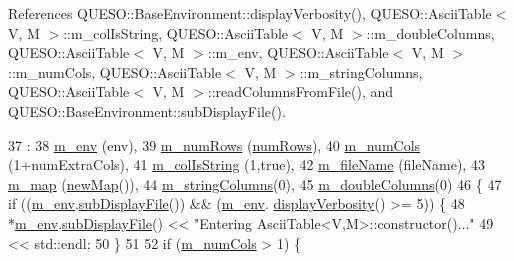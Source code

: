 References Q\-U\-E\-S\-O\-::\-Base\-Environment\-::display\-Verbosity(), Q\-U\-E\-S\-O\-::\-Ascii\-Table$<$ V, M $>$\-::m\-\_\-col\-Is\-String, Q\-U\-E\-S\-O\-::\-Ascii\-Table$<$ V, M $>$\-::m\-\_\-double\-Columns, Q\-U\-E\-S\-O\-::\-Ascii\-Table$<$ V, M $>$\-::m\-\_\-env, Q\-U\-E\-S\-O\-::\-Ascii\-Table$<$ V, M $>$\-::m\-\_\-num\-Cols, Q\-U\-E\-S\-O\-::\-Ascii\-Table$<$ V, M $>$\-::m\-\_\-string\-Columns, Q\-U\-E\-S\-O\-::\-Ascii\-Table$<$ V, M $>$\-::read\-Columns\-From\-File(), and Q\-U\-E\-S\-O\-::\-Base\-Environment\-::sub\-Display\-File().


\begin{DoxyCode}
37   :
38   \hyperlink{class_q_u_e_s_o_1_1_ascii_table_a2ba907db652aa02d53d493980d7a3753}{m\_env}          (env),
39   \hyperlink{class_q_u_e_s_o_1_1_ascii_table_a4f772a7719d36cb0a0908eed37bd1deb}{m\_numRows}      (\hyperlink{class_q_u_e_s_o_1_1_ascii_table_aa764ef68ef1d2ed85a4b6bd4eb0d7b17}{numRows}),
40   \hyperlink{class_q_u_e_s_o_1_1_ascii_table_ada886c8db06d2d618f2898ad2cf2bd87}{m\_numCols}      (1+numExtraCols),
41   \hyperlink{class_q_u_e_s_o_1_1_ascii_table_a1c84e461d75e0846c156617f222c2ec3}{m\_colIsString}  (1,\textcolor{keyword}{true}),
42   \hyperlink{class_q_u_e_s_o_1_1_ascii_table_adb7e4bac907ef1c93d745f02ea9f15d2}{m\_fileName}     (fileName),
43   \hyperlink{class_q_u_e_s_o_1_1_ascii_table_a7771fe0a08a93abdeadcc5e55e350eea}{m\_map}          (\hyperlink{class_q_u_e_s_o_1_1_ascii_table_aa42459bf69563f6606103c5f6da60a5a}{newMap}()),
44   \hyperlink{class_q_u_e_s_o_1_1_ascii_table_a14ba55d29e9a4ddeb14cd5acd8a27268}{m\_stringColumns}(0),
45   \hyperlink{class_q_u_e_s_o_1_1_ascii_table_aa25a1d14c88cd5de341c43e052622f51}{m\_doubleColumns}(0)
46 \{
47   \textcolor{keywordflow}{if} ((\hyperlink{class_q_u_e_s_o_1_1_ascii_table_a2ba907db652aa02d53d493980d7a3753}{m\_env}.\hyperlink{class_q_u_e_s_o_1_1_base_environment_a8a0064746ae8dddfece4229b9ad374d6}{subDisplayFile}()) && (\hyperlink{class_q_u_e_s_o_1_1_ascii_table_a2ba907db652aa02d53d493980d7a3753}{m\_env}.
      \hyperlink{class_q_u_e_s_o_1_1_base_environment_a1fe5f244fc0316a0ab3e37463f108b96}{displayVerbosity}() >= 5)) \{
48     *\hyperlink{class_q_u_e_s_o_1_1_ascii_table_a2ba907db652aa02d53d493980d7a3753}{m\_env}.\hyperlink{class_q_u_e_s_o_1_1_base_environment_a8a0064746ae8dddfece4229b9ad374d6}{subDisplayFile}() << \textcolor{stringliteral}{"Entering AsciiTable<V,M>::constructor()..."}
49                             << std::endl;
50   \}
51 
52   \textcolor{keywordflow}{if} (\hyperlink{class_q_u_e_s_o_1_1_ascii_table_ada886c8db06d2d618f2898ad2cf2bd87}{m\_numCols} > 1) \{

\end{DoxyCode}
